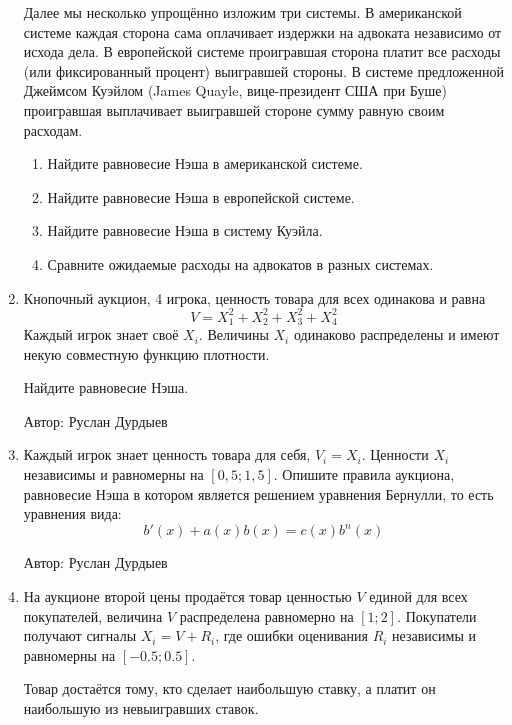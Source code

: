 \begin{enumerate}
Далее мы несколько упрощённо изложим три системы. В американской системе каждая сторона сама оплачивает издержки на адвоката независимо от исхода дела. В европейской системе проигравшая сторона платит все расходы (или фиксированный процент) выигравшей стороны. В системе предложенной Джеймсом Куэйлом (James Quayle, вице-президент США при Буше) проигравшая выплачивает выигравшей стороне сумму равную своим расходам.
\begin{enumerate}
\item Найдите равновесие Нэша в американской системе.
\item Найдите равновесие Нэша в европейской системе.
\item Найдите равновесие Нэша в систему Куэйла.
\item Сравните ожидаемые расходы на адвокатов в разных системах.
\end{enumerate}


\item Кнопочный аукцион, 4 игрока, ценность товара для всех одинакова и равна
\begin{equation}
V=X_{1}^{2}+X_{2}^{2}+X_{3}^{2}+X_{4}^{2}
\end{equation}
Каждый игрок знает своё $X_{i}$. Величины $X_{i}$ одинаково распределены и имеют некую совместную функцию плотности.

Найдите равновесие Нэша.

Автор: Руслан Дурдыев

\item Каждый игрок знает ценность товара для себя, $V_{i}=X_{i}$. Ценности $X_{i}$ независимы и равномерны на $[0,5;1,5]$. Опишите правила аукциона, равновесие Нэша в котором является решением уравнения Бернулли, то есть уравнения вида:
\begin{equation}
b'(x)+a(x)b(x)=c(x)b^{n}(x)
\end{equation}

Автор: Руслан Дурдыев

\item На аукционе второй цены продаётся товар ценностью $V$ единой для всех покупателей, величина $V$ распределена равномерно на $[1;2]$. Покупатели получают сигналы $X_{i}=V+R_{i}$, где ошибки оценивания $R_{i}$ независимы и равномерны на $[-0.5;0.5]$. 

Товар достаётся тому, кто сделает наибольшую ставку, а платит он наибольшую из невыигравших ставок.


\end{enumerate}
